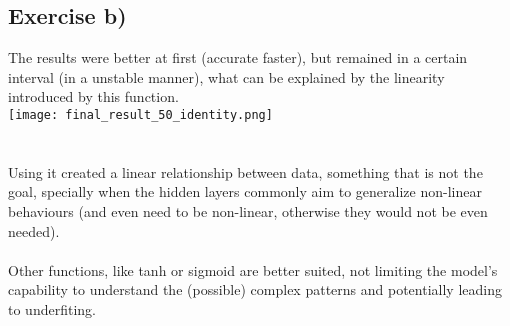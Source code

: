 \documentclass{article}
\begin{document}
\subsection{Exercise b)}
The results were better at first (accurate faster), but remained in a certain interval (in a unstable manner), what can be explained by the linearity introduced by this function.
\\
\texttt{[image: final\_result\_50\_identity.png]}\\[1ex]
\\
\\
Using it created a linear relationship between data, something that is not the goal, specially when the hidden layers commonly aim to generalize non-linear behaviours (and even need to be non-linear, otherwise they would not be even needed).
\\
\\
Other functions, like tanh or sigmoid are better suited, not limiting the model's capability to understand the (possible) complex patterns and potentially leading to underfiting.
\end{document}

